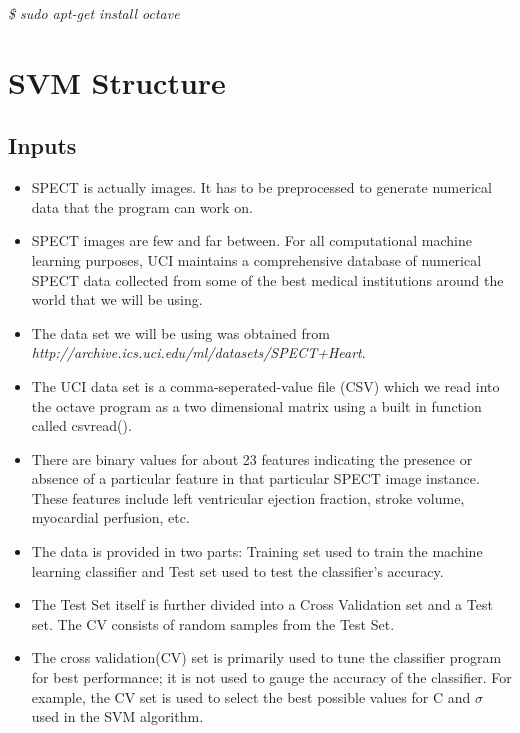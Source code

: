 \documentclass[11pt,a4paper]{report}
\begin{document}
{\centerline{\emph{\$ sudo apt-get install octave}}
\smallskip

\section{SVM Structure}    

\subsection{Inputs}

\bigskip
\begin{itemize}
\item SPECT is actually images. It has to be preprocessed to generate numerical data that the program can work on.\\
\item SPECT images are few and far between. For all computational machine learning purposes, UCI maintains a comprehensive database of numerical SPECT data collected from some of the best medical institutions around the world that we will be using.\\  
\item The data set we will be using was obtained from \\ \emph{http://archive.ics.uci.edu/ml/datasets/SPECT+Heart}.\\
\item The UCI data set is a comma-seperated-value file (CSV) which we read into the octave program as a two dimensional matrix using a built in function called csvread(). \\  
\item There are binary values for about 23 features indicating the presence or absence of a particular feature in that particular SPECT image instance. These features include left ventricular ejection fraction, stroke volume, myocardial perfusion, etc.\\
\item The data is provided in two parts: Training set used to train the machine learning classifier and Test set used to test the classifier’s accuracy.\\  
\item The Test Set itself is further divided into a Cross Validation set and a Test set. The CV consists of random samples from the Test Set. \\  
\item The cross validation(CV) set is primarily used to tune the classifier program for best performance; it is not used to gauge the accuracy of the classifier. For example, the CV set is used to select the best possible values for C and $\sigma$ used in the SVM algorithm.\\

\end{itemize}}
\end{document}

